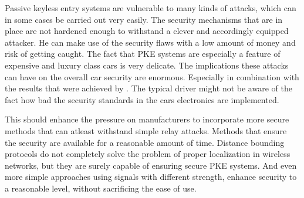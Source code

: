 Passive keyless entry systems are vulnerable to many kinds of attacks,
which can in some cases be carried out very easily.
The security mechanisms that are in place are not hardened enough to withstand
a clever and accordingly equipped attacker.
He can make use of the security flaws with a low amount of money and risk of getting caught.
The fact that PKE systems are especially a feature of expensive and luxury class cars is very delicate.
The implications these attacks can have on the overall car security are enormous.
Especially in combination with the results that were achieved by \cite{expModernAuto}.
The typical driver might not be aware of the fact how bad the security standards
in the cars electronics are implemented.

This should enhance the pressure on manufacturers to incorporate more secure methods
that can atleast withstand simple relay attacks.
Methods that ensure the security are available for a reasonable amount of time.
Distance bounding protocols do not completely solve the problem of proper localization in
wireless networks,
but they are surely capable of ensuring secure PKE systems.
And even more simple approaches using signals with different strength,
enhance security to a reasonable level,
without sacrificing the ease of use.